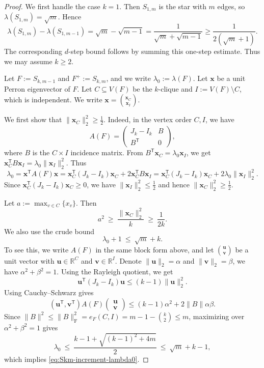 \documentclass[10pt,a4paper]{amsart}
\begin{document}
\begin{proof}
We first handle the case \(k=1\). Then \(S_{1,m}\) is the star with \(m\) edges, so $\lambda(S_{1,m})=\sqrt m$. Hence
\[
        \lambda(S_{1,m})-\lambda(S_{1,m-1})
        =
        \sqrt m-\sqrt{m-1}
        =
        \frac{1}{\sqrt m+\sqrt{m-1}}
        \ge
        \frac{1}{2(\sqrt m+1)}.
\]
The corresponding \(d\)-step bound follows by summing this one-step estimate. Thus we may assume \(k\ge2\).

Let $F:=S_{k,m-1}$ and $F^+:=S_{k,m}$, and we write $\lambda_0:=\lambda(F)$.
Let $\bm{x}$ be a unit Perron eigenvector of $F$.
Let $C\subseteq V(F)$ be the $k$-clique and $I:=V(F)\setminus C$, which is independent. We  write $\bm{x}={\bm{x}_C \choose \bm{x}_I}$.

We first show that $\|\bm{x}_C\|_2^2\ge \tfrac12$.
Indeed, in the vertex order $C,I$, we have 
\[
  A(F)=
  \begin{pmatrix}
    J_k-I_k & B\\
    B^{\mathsf T} & 0
  \end{pmatrix},
\]
where $B$ is the $C\times I$ incidence matrix.
From $B^{\mathsf T} \bm{x}_C=\lambda_0 \bm{x}_I$, we get $\bm{x}_C^{\mathsf T}B \bm{x}_I=\lambda_0\| \bm{x}_I\|_2^2.$
Thus
\[
  \lambda_0
  =\bm{x}^{\mathsf T}A(F) \bm{x}
  = \bm{x}_C^{\mathsf T}(J_k-I_k) \bm{x}_C+ 2 \bm{x}_C^{\mathsf T}B \bm{x}_I 
  =
  \bm{x}_C^{\mathsf T}(J_k-I_k) \bm{x}_C+2\lambda_0\| \bm{x}_I\|_2^2.
\]
Since $\bm{x}_C^{\mathsf T}(J_k-I_k)\bm{x}_C\ge 0$, we have $\|\bm{x}_I\|_2^2\le \tfrac12$ and hence $\|\bm{x}_C\|_2^2\ge \tfrac12$.

Let $a:=\max_{v\in C} \{x_v\}$.
Then
\begin{equation}\label{eq:Skm-increment-a2}
  a^2\ \ge\ \frac{\|\bm{x}_C\|_2^2}{k}\ \ge\ \frac{1}{2k}.
\end{equation} 
We also use the crude bound
\begin{equation}\label{eq:Skm-increment-lambda0}
  \lambda_0+1\ \le\ \sqrt m+k.
\end{equation}
To see this, we write $A(F)$ in the same block form above, and let ${\bm{u} \choose \bm{v}}$ be a unit vector with $\bm{u}\in\mathbb R^C$ and $\bm{v} \in\mathbb R^I$.
Denote $\|\bm{u}\|_2=\alpha$ and $\|\bm{v}\|_2=\beta$, we have $\alpha^2+\beta^2=1$. 
Using the Rayleigh quotient, we get
\[
        \bm{u}^{\mathsf T}(J_k -I_k) \bm{u}
        \le
        (k-1) \|\bm{u}\|_2^2.
\]
Using Cauchy--Schwarz gives 
\[
  (\bm{u}^{\mathsf T},\bm{v}^{\mathsf T})A(F)
  \begin{pmatrix}
    \bm{u} \\ \bm{v}
  \end{pmatrix}
  \le
  (k-1)\alpha^2+2\|B\|\alpha\beta.
\]
Since $ \|B\|^2 \le \|B\|_{\mathrm F}^2=e_F(C,I)=m-1-\binom{k}{2}\le m$, maximizing over $\alpha^2+\beta^2=1$ gives
\[
  \lambda_0
  \ \le\
  \frac{k-1+\sqrt{(k-1)^2+4m}}{2}
  \ \le\
  \sqrt m+k-1,
\]
which implies \eqref{eq:Skm-increment-lambda0}.


\end{proof}
\end{document}
